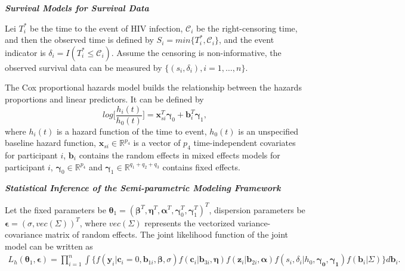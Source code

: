 \vspace{2mm}
\noindent \textbf{\textit{Survival Models for Survival Data}}
\vspace{2mm}

Lei $T_i^{\ast}$ be the time to the event of HIV infection, $\mathcal{C}_i$ be the right-censoring time, and then the observed time is defined by $S_i = min\{ T_i^{\ast}, \mathcal{C}_i\}$, and the event indicator is $\delta_i = I(T_i^{\ast} \leq \mathcal{C}_i)$. Assume the censoring is non-informative, the observed survival data can be measured by $\{(s_i, \delta_i),i=1,\dots,n \}$.

The Cox proportional hazards model builds the relationship between the hazards proportions and linear predictors. It can be defined by
\begin{equation}
    log\Big[\frac{h_i(t)}{h_0(t)}\Big] = \boldsymbol{x}_{si}^T \boldsymbol{\gamma}_0 + \boldsymbol{b}_i^T  \boldsymbol{\gamma}_1,
\end{equation}
where $h_i(t)$ is a hazard function of the time to event, $h_0(t)$ is an unspecified baseline hazard function, $\boldsymbol{x}_{si}\in \mathbb{R}^{p_4}$ is a vector of $p_4$ time-independent covariates for participant $i$, $\boldsymbol{b}_i$ contains the random effects in mixed effects models for participant $i$, $\boldsymbol{\gamma}_0\in \mathbb{R}^{p_4}$ and $\boldsymbol{\gamma}_1\in \mathbb{R}^{q_1+q_2+q_3}$ contains fixed effects.


\vspace{2mm}
\noindent \textbf{\textit{Statistical Inference of the Semi-parametric Modeling Framework}}
\vspace{2mm}

Let the fixed parameters be $\boldsymbol{\theta}_1 = (\boldsymbol{\beta}^T,\boldsymbol{\eta}^T,\boldsymbol{\alpha}^T, \boldsymbol{\gamma}_0^T,\boldsymbol{\gamma}_1^T)^T$, dispersion parameters be $\boldsymbol{\epsilon} = (\sigma, vec({\Sigma}))^T$, where $vec({\Sigma})$ represents the vectorized variance-covariance matrix of random effects. 
The joint likelihood function of the joint model can be written as
\begin{equation}
    \begin{split}
        L_h (\boldsymbol{\theta}_1,\boldsymbol{\epsilon}) = \prod_{i=1}^n \int\{ f(\boldsymbol{y}_{i}|\boldsymbol{c}_{i}=0,\boldsymbol{b}_{1i},\boldsymbol{\beta},\sigma) f(\boldsymbol{c}_{i}|\boldsymbol{b}_{3i},\boldsymbol{\eta}) f(\boldsymbol{z}_{i}|\boldsymbol{b}_{2i},\boldsymbol{\alpha}) f(s_i,\delta_i|h_0,\boldsymbol{\gamma_0},\boldsymbol{\gamma_1}) f(\boldsymbol{b}_i|\Sigma)\} d \boldsymbol{b}_i.
    \end{split}
\end{equation}



